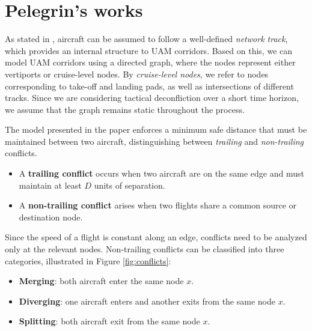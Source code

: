 \documentclass[../../thesis.tex]{subfiles}
\begin{document}
\section{Pelegrin's works}

As stated in \cite{pelegrin-2023}, aircraft can be assumed to follow a well-defined \textit{network track}, which provides an internal structure to UAM corridors.  
Based on this, we can model UAM corridors using a directed graph, where the nodes represent either vertiports or cruise-level nodes.  
By \textit{cruise-level nodes}, we refer to nodes corresponding to take-off and landing pads, as well as intersections of different tracks.  
Since we are considering tactical deconfliction over a short time horizon, we assume that the graph remains static throughout the process.  

The model presented in the paper enforces a minimum safe distance that must be maintained between two aircraft, distinguishing between \textit{trailing} and \textit{non-trailing} conflicts.  
\begin{itemize}
    \item A \textbf{trailing conflict} occurs when two aircraft are on the same edge and must maintain at least $D$ units of separation.  
    \item A \textbf{non-trailing conflict} arises when two flights share a common source or destination node.  
\end{itemize}  

Since the speed of a flight is constant along an edge, conflicts need to be analyzed only at the relevant nodes.  
Non-trailing conflicts can be classified into three categories, illustrated in Figure \ref{fig:conflicts}:  
\begin{itemize}
    \item \textbf{Merging}: both aircraft enter the same node $x$.  
    \item \textbf{Diverging}: one aircraft enters and another exits from the same node $x$.  
    \item \textbf{Splitting}: both aircraft exit from the same node $x$.  
\end{itemize}  
\end{document}
